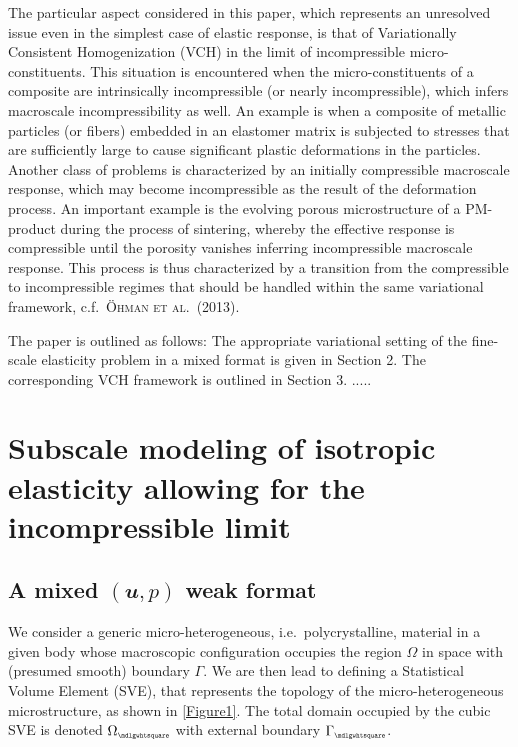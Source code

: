 \documentclass[12pt,a4paper]{article}
\renewcommand{\ta}[1]{\mathbfit{#1}}
\renewcommand{\Box}{\mdlgwhtsquare}
\newcommand{\rve}{
  {\mathchoice
   {\mbox{\scalebox{0.67}{$\Box$}}}
   {\mbox{\scalebox{0.67}{$\Box$}}}
   {\mbox{\scalebox{0.5}{$\Box$}}}
   {\mbox{\scalebox{0.375}{$\Box$}}}
  }
}
\begin{document}
The particular aspect considered in this paper, which represents an unresolved issue even in the simplest case of elastic response, is that of Variationally Consistent Homogenization (VCH) in the limit of incompressible micro-constituents.
This situation is encountered when the micro-constituents of a composite are intrinsically incompressible (or nearly incompressible), which infers macroscale incompressibility as well.
An example is when a composite of metallic particles (or fibers) embedded in an elastomer matrix is subjected to stresses that are sufficiently large to cause significant plastic deformations in the particles.
Another class of problems is characterized by an initially compressible macroscale response, which may become incompressible as the result of the deformation process.
An important example is the evolving porous microstructure of a PM-product during the process of sintering, whereby the effective response is compressible until the porosity vanishes inferring incompressible macroscale response.
This process is thus characterized by a transition from the compressible to incompressible regimes that should be handled within the same variational framework, c.f.\  \textsc{Öhman et al.\ (2013)}.

The paper is outlined as follows: The appropriate variational setting of the fine-scale elasticity problem in a mixed format is given in Section 2.
The corresponding VCH framework is outlined in Section 3. .....


\section{Subscale modeling of isotropic elasticity allowing for the incompressible limit}

\subsection{A mixed $(\ta{u},p)$ weak format}

We consider a generic micro-heterogeneous, i.e.\ polycrystalline, material in a given body whose macroscopic configuration occupies the region $\Omega$ in space with (presumed smooth) boundary $\Gamma$.
We are then lead to defining a Statistical Volume Element (SVE), that represents the topology of the micro-heterogeneous microstructure, as shown in \cref{Figure1}.
The total domain occupied by the cubic SVE is denoted $\Omega_\rve$ with external boundary $\Gamma_\rve$.
\end{document}

